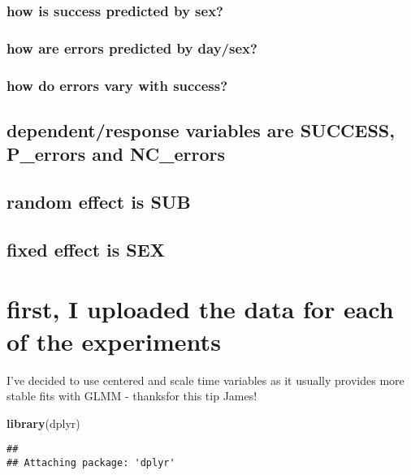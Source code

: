 \documentclass[]{article}
\newenvironment{Shaded}{\begin{snugshade}}{\end{snugshade}}
\newcommand{\KeywordTok}[1]{\textcolor[rgb]{0.13,0.29,0.53}{\textbf{#1}}}
\newcommand{\NormalTok}[1]{#1}
\begin{document}
\subsubsection{how is success predicted by
sex?}\label{how-is-success-predicted-by-sex}

\subsubsection{how are errors predicted by
day/sex?}\label{how-are-errors-predicted-by-daysex}

\subsubsection{how do errors vary with
success?}\label{how-do-errors-vary-with-success}

\subsection{dependent/response variables are SUCCESS, P\_errors and
NC\_errors}\label{dependentresponse-variables-are-success-p_errors-and-nc_errors}

\subsection{random effect is SUB}\label{random-effect-is-sub}

\subsection{fixed effect is SEX}\label{fixed-effect-is-sex}

\section{first, I uploaded the data for each of the
experiments}\label{first-i-uploaded-the-data-for-each-of-the-experiments}

I've decided to use centered and scale time variables as it usually
provides more stable fits with GLMM - thanksfor this tip James!

\begin{Shaded}
\begin{Highlighting}[]
\KeywordTok{library}\NormalTok{(dplyr)}
\end{Highlighting}
\end{Shaded}

\begin{verbatim}
## 
## Attaching package: 'dplyr'
\end{verbatim}
\end{document}
